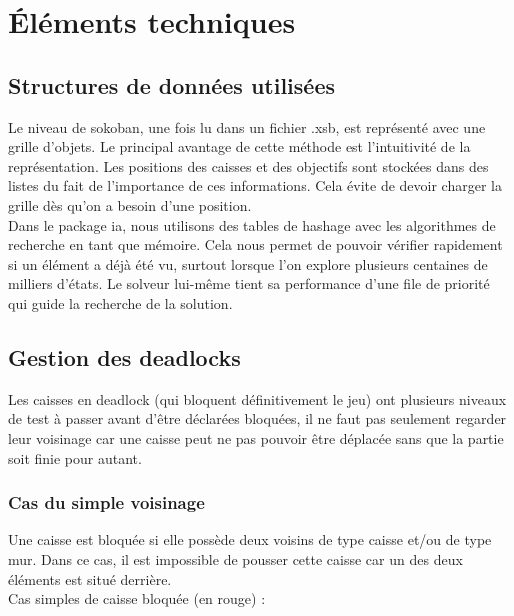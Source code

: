 \documentclass[a4paper,12pt]{article} %
\begin{document}
\section{Éléments techniques}\label{et}

\subsection{Structures de données utilisées}

Le niveau de sokoban, une fois lu dans un fichier .xsb, est représenté avec une grille d'objets. Le principal avantage de cette méthode est l'intuitivité de la représentation.
Les positions des caisses et des objectifs sont stockées dans des listes du fait de l'importance de ces informations. Cela évite de devoir charger la grille dès qu'on a besoin d'une position.\\

Dans le package ia, nous utilisons des tables de hashage avec les algorithmes de recherche en tant que mémoire. Cela nous permet de pouvoir vérifier rapidement si un élément a déjà été vu, surtout lorsque l'on explore plusieurs centaines de milliers d'états.
Le solveur lui-même tient sa performance d'une file de priorité qui guide la recherche de la solution.

\subsection{Gestion des deadlocks}

Les caisses en deadlock (qui bloquent définitivement le jeu) ont plusieurs niveaux de test à passer avant d'être déclarées bloquées, il ne faut pas seulement regarder leur voisinage car une caisse peut ne pas pouvoir être déplacée sans que la partie soit finie pour autant.

\subsubsection{Cas du simple voisinage}

Une caisse est bloquée si elle possède deux voisins de type caisse et/ou de type mur. Dans ce cas, il est impossible de pousser cette caisse car un des deux éléments est situé derrière.\\

Cas simples de caisse bloquée (en rouge) : 
\end{document}

